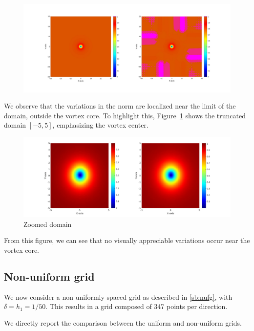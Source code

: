 \begin{figure}[H]
    \centering
    \includegraphics[width=\textwidth]{img/ltufd20t347s30L_color.pdf}
\end{figure}

We observe that the variations in the norm are localized near the limit of the domain, outside the vortex core. To highlight this, Figure~\ref{fig:vortex_center} shows the truncated domain $[-5,5]$, emphasizing the vortex center.

\begin{figure}[H]
    \centering
    \includegraphics[width=\textwidth]{img/ltufd20t347s30L_5.pdf}
    \caption{Zoomed domain}
    \label{fig:vortex_center}
\end{figure}

From this figure, we can see that no visually appreciable variations occur near the vortex core.

\subsection{Non-uniform grid}

We now consider a non-uniformly spaced grid as described in \ref{sb:nufg}, with $\delta = h_1 = 1/50$. This results in a grid composed of 347 points per direction.

We directly report the comparison between the uniform and non-uniform grids.

